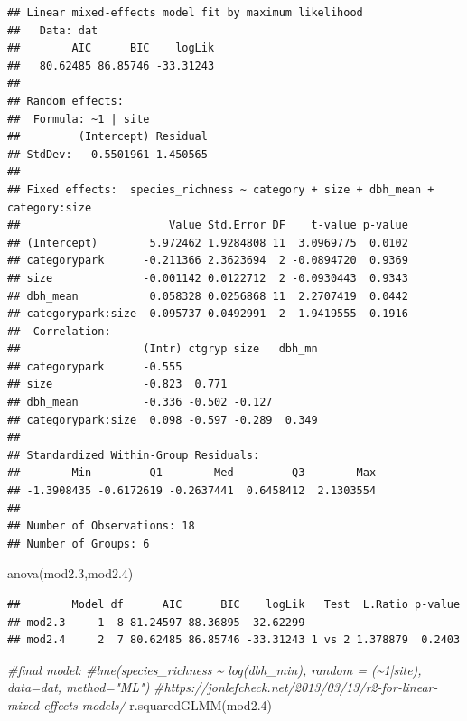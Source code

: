 \documentclass[
]{article}
\newenvironment{Shaded}{\begin{snugshade}}{\end{snugshade}}
\newcommand{\CommentTok}[1]{\textcolor[rgb]{0.56,0.35,0.01}{\textit{#1}}}
\newcommand{\FloatTok}[1]{\textcolor[rgb]{0.00,0.00,0.81}{#1}}
\newcommand{\FunctionTok}[1]{\textcolor[rgb]{0.00,0.00,0.00}{#1}}
\newcommand{\NormalTok}[1]{#1}
\begin{document}
\begin{verbatim}
## Linear mixed-effects model fit by maximum likelihood
##   Data: dat 
##        AIC      BIC    logLik
##   80.62485 86.85746 -33.31243
## 
## Random effects:
##  Formula: ~1 | site
##         (Intercept) Residual
## StdDev:   0.5501961 1.450565
## 
## Fixed effects:  species_richness ~ category + size + dbh_mean + category:size 
##                       Value Std.Error DF    t-value p-value
## (Intercept)        5.972462 1.9284808 11  3.0969775  0.0102
## categorypark      -0.211366 2.3623694  2 -0.0894720  0.9369
## size              -0.001142 0.0122712  2 -0.0930443  0.9343
## dbh_mean           0.058328 0.0256868 11  2.2707419  0.0442
## categorypark:size  0.095737 0.0492991  2  1.9419555  0.1916
##  Correlation: 
##                   (Intr) ctgryp size   dbh_mn
## categorypark      -0.555                     
## size              -0.823  0.771              
## dbh_mean          -0.336 -0.502 -0.127       
## categorypark:size  0.098 -0.597 -0.289  0.349
## 
## Standardized Within-Group Residuals:
##        Min         Q1        Med         Q3        Max 
## -1.3908435 -0.6172619 -0.2637441  0.6458412  2.1303554 
## 
## Number of Observations: 18
## Number of Groups: 6
\end{verbatim}

\begin{Shaded}
\begin{Highlighting}[]
\FunctionTok{anova}\NormalTok{(mod2}\FloatTok{.3}\NormalTok{,mod2}\FloatTok{.4}\NormalTok{)}
\end{Highlighting}
\end{Shaded}

\begin{verbatim}
##        Model df      AIC      BIC    logLik   Test  L.Ratio p-value
## mod2.3     1  8 81.24597 88.36895 -32.62299                        
## mod2.4     2  7 80.62485 86.85746 -33.31243 1 vs 2 1.378879  0.2403
\end{verbatim}

\begin{Shaded}
\begin{Highlighting}[]
\CommentTok{\#final model:}
\CommentTok{\#lme(species\_richness \textasciitilde{} log(dbh\_min), random = (\textasciitilde{}1|site), data=dat, method="ML")}
\CommentTok{\#https://jonlefcheck.net/2013/03/13/r2{-}for{-}linear{-}mixed{-}effects{-}models/}
\FunctionTok{r.squaredGLMM}\NormalTok{(mod2}\FloatTok{.4}\NormalTok{)}
\end{Highlighting}
\end{Shaded}
\end{document}
